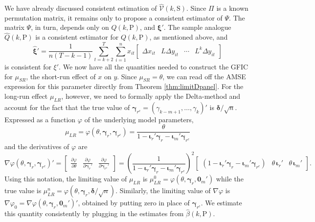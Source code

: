 We have already discussed consistent estimation of $\widehat{\mathcal{V}}(k,\text{S})$.
Since $\Pi$ is a known permutation matrix, it remains only to propose a consistent estimator of $\Psi$. 
The matrix $\Psi$, in turn, depends only on $Q(k,\text{P})$, and $\boldsymbol{\xi}'$.
The sample analogue $\widehat{Q}(k,\text{P})$ is a consistent estimator for $Q(k,\text{P})$, as mentioned above, and
\begin{equation}
  \widehat{\boldsymbol{\xi}}' = \frac{1}{n(T - k - 1)} \sum_{t = k+2}^T \sum_{i=1}^n x_{it}\left[
  \begin{array}{cccc}
    \Delta x_{it} & L \Delta y_{it} & \cdots & L^{k} \Delta y_{it} 
  \end{array}
\right]
\end{equation}
is consistent for $\xi'$.
We now have all the quantities needed to construct the GFIC for $\mu_{SR}$, the short-run effect of $x$ on $y$.
Since $\mu_{SR} = \theta$, we can read off the AMSE expression for this parameter directly from Theorem \ref{thm:limitDpanel}.
For the long-run effect $\mu_{LR}$, however, we need to formally apply the Delta-method and account for the fact that the true value of $\boldsymbol{\gamma}_{r^c} = (\gamma_{k-m+1}, \ldots, \gamma_k)'$ is $\boldsymbol{\delta}/\sqrt{n}$.
Expressed as a function $\varphi$ of the underlying model parameters, 
\[
  \mu_{LR} = \varphi(\theta, \boldsymbol{\gamma}_r, \boldsymbol{\gamma}_{r^c}) = \frac{\theta}{1 - \boldsymbol{\iota}_r' \boldsymbol{\gamma}_r - \boldsymbol{\iota}_m'\boldsymbol{\gamma}_{r^c}}
\]
and the derivatives of $\varphi$ are
\[
  \nabla \varphi(\theta, \boldsymbol{\gamma}_r, \boldsymbol{\gamma}_{r^c})' = \left[
  \begin{array}{ccc}
    \displaystyle\frac{\partial \varphi}{\partial \theta} & 
    \displaystyle\frac{\partial \varphi}{\partial \boldsymbol{\gamma}_r'} &
    \displaystyle\frac{\partial \varphi}{\partial \boldsymbol{\gamma}_{r^c}'} 
  \end{array}
\right] = 
\left( \frac{1}{1 - \boldsymbol{\iota}_r' \boldsymbol{\gamma}_r - \boldsymbol{\iota}_m' \boldsymbol{\gamma}_{r^c}} \right)^2 \left[
\begin{array}{ccc}
  \left( 1 - \boldsymbol{\iota}_r' \boldsymbol{\gamma}_r - \boldsymbol{\iota}_m'\boldsymbol{\gamma}_{r^c} \right) & \theta \,\boldsymbol{\iota}_r' & \theta \, \boldsymbol{\iota}_m' 
\end{array}
\right].
\]
Using this notation, the limiting value of $\mu_{LR}$ is $\mu_{LR}^{0} =  \varphi(\theta, \boldsymbol{\gamma}_r, \boldsymbol{0}_m')$
while the true value is
$\mu_{LR}^{n} = \varphi(\theta, \boldsymbol{\gamma}_r, \boldsymbol{\delta}/\sqrt{n})$.
Similarly, the limiting value of $\nabla\varphi$ is $\nabla \varphi_0 = \nabla \varphi(\theta, \boldsymbol{\gamma}_r, \boldsymbol{0}_m')'$, obtained by putting zero in place of $\boldsymbol{\gamma}_{r^c}$. 
We estimate this quantity consistently by plugging in the estimates from $\widehat{\beta}(k, \text{P})$.


